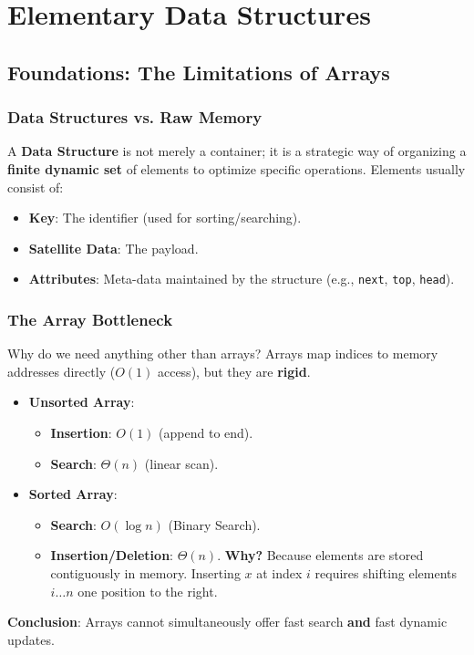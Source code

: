 \documentclass[12pt]{article}
\theoremstyle{blueplain}
\theoremstyle{bluedef}
\theoremstyle{blueremark}
\begin{document}
\clearpage


\section{Elementary Data Structures}

\subsection{Foundations: The Limitations of Arrays}

\subsubsection{Data Structures vs. Raw Memory}
A \textbf{Data Structure} is not merely a container; it is a strategic way of organizing a \textbf{finite dynamic set} of elements to optimize specific operations.
Elements usually consist of:
\begin{itemize}
    \item \textbf{Key}: The identifier (used for sorting/searching).
    \item \textbf{Satellite Data}: The payload.
    \item \textbf{Attributes}: Meta-data maintained by the structure (e.g., \texttt{next}, \texttt{top}, \texttt{head}).
\end{itemize}

\subsubsection{The Array Bottleneck}
Why do we need anything other than arrays? Arrays map indices to memory addresses directly ($O(1)$ access), but they are \textbf{rigid}.
\begin{itemize}
    \item \textbf{Unsorted Array}:
          \begin{itemize}
              \item \textbf{Insertion}: $O(1)$ (append to end).
              \item \textbf{Search}: $\Theta(n)$ (linear scan).
          \end{itemize}
    \item \textbf{Sorted Array}:
          \begin{itemize}
              \item \textbf{Search}: $O(\log n)$ (Binary Search).
              \item \textbf{Insertion/Deletion}: $\Theta(n)$. \textbf{Why?} Because elements are stored contiguously in memory. Inserting $x$ at index $i$ requires shifting elements $i \dots n$ one position to the right.
          \end{itemize}
\end{itemize}
\textbf{Conclusion}: Arrays cannot simultaneously offer fast search \textbf{and} fast dynamic updates.
\end{document}
